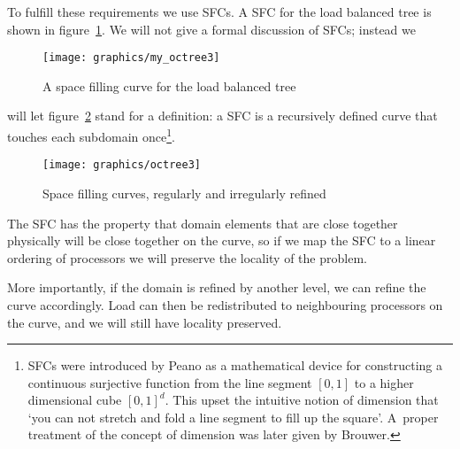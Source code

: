 To fulfill these requirements we use \acfp{SFC}. A \acf{SFC} for the
load balanced tree is shown in figure~\ref{fig:octree-sfc}. We will
not give a formal discussion of \acp{SFC}; instead we
\begin{figure}[ht]
  \texttt{[image: graphics/my\_octree3]}
  \caption{A space filling curve for the load balanced tree}
  \label{fig:octree-sfc}
\end{figure}
will let figure~\ref{fig:octree3} stand for a definition: a \ac{SFC} is a
recursively defined curve that touches each subdomain
once\footnote{\acfp{SFC} were introduced by Peano as a mathematical
  device for constructing a continuous surjective function from the
  line segment $[0,1]$ to a higher dimensional cube $[0,1]^d$. This
  upset the intuitive notion of dimension that `you can not stretch
  and fold a line segment to fill up the square'. A~proper treatment
  of the concept of dimension was later given by Brouwer.}.
\begin{figure}[ht]
  \texttt{[image: graphics/octree3]}
  \caption{Space filling curves, regularly and irregularly refined}
  \label{fig:octree3}
\end{figure}
The \ac{SFC} has the property that domain elements that are close
together physically will be close together on the curve, so if we map
the \ac{SFC} to a linear ordering of processors we will preserve the
locality of the problem. 

More importantly, if the domain is refined by
another level, we can refine the curve accordingly. Load can then be
redistributed to neighbouring processors on the curve, and we will
still have locality preserved.


\endinput
\Level 2 {Task migration}

An extreme case of load balancing is \indexterm{task migration}, where
a whole process is moved between processors.



